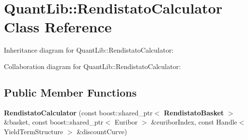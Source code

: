 \section{Quant\+Lib\+:\+:Rendistato\+Calculator Class Reference}
\label{class_quant_lib_1_1_rendistato_calculator}


Inheritance diagram for Quant\+Lib\+:\+:Rendistato\+Calculator\+:


Collaboration diagram for Quant\+Lib\+:\+:Rendistato\+Calculator\+:
\subsection*{Public Member Functions}
\begin{DoxyCompactItemize}
\item 
{\bfseries Rendistato\+Calculator} (const boost\+::shared\+\_\+ptr$<$ {\bf Rendistato\+Basket} $>$ \&basket, const boost\+::shared\+\_\+ptr$<$ Euribor $>$ \&euribor\+Index, const Handle$<$ Yield\+Term\+Structure $>$ \&discount\+Curve)\label{class_quant_lib_1_1_rendistato_calculator_a30454bdd1ce4fd269c7385ff93314e6a}

\end{DoxyCompactItemize}
